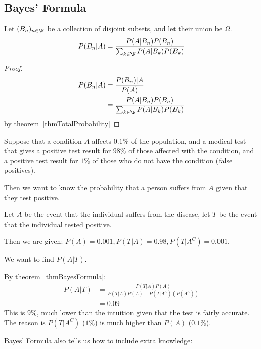 \documentclass[../Main.tex]{subfiles}
\begin{document}
\subsection{Bayes' Formula}
\begin{theorem}
    Let $(B_n)_{n \in \N}$ be a collection of disjoint subsets, and let their union be $\Omega$.
    \begin{equation*}
        P(B_n | A) = \frac{P(A | B_n) P(B_n)}{\sum_{k \in \N} P(A | B_k) P(B_k)}
    \end{equation*}
    \label{thmBayesFormula}
\end{theorem}
\begin{proof}
    \begin{align*}
        P(B_n | A) &= \frac{P(B_n) | A}{P(A)} \\
        &= \frac{P(A | B_n)P(B_n)}{\sum_{k \in \N} P(A | B_k) P(B_k)}
    \end{align*}
    by theorem~\ref{thmTotalProbability}
\end{proof}
\begin{example}
    Suppose that a condition $A$ affects $0.1 \%$ of the population, and a medical test that gives a positive test result for $98\%$ of those affected with the condition, and a positive test result for $1\%$ of those who do not have the condition (false positives).\par
    Then we want to know the probability that a person suffers from $A$ given that they test positive.\par
    Let $A$ be the event that the individual suffers from the disease, let $T$ be the event that the individual tested positive.\par
    Then we are given: $P(A) = 0.001, P(T | A) = 0.98, P(T | A^C) = 0.001$.\par
    We want to find $P(A | T)$.\par
    By theorem~\ref{thmBayesFormula}:
    \begin{align*}
        P(A | T) &= \frac{P(T | A)P(A)}{P(T | A)P(A) + P(T | A^C)(P(A^C))} \\
        &= 0.09
    \end{align*}
    This is $9\%$, much lower than the intuition given that the test is fairly accurate. The reason is $P(T | A^C)$ ($1\%$) is much higher than $P(A)$ ($0.1\%$).
\end{example}
Bayes' Formula also tells us how to include extra knowledge:
\end{document}
